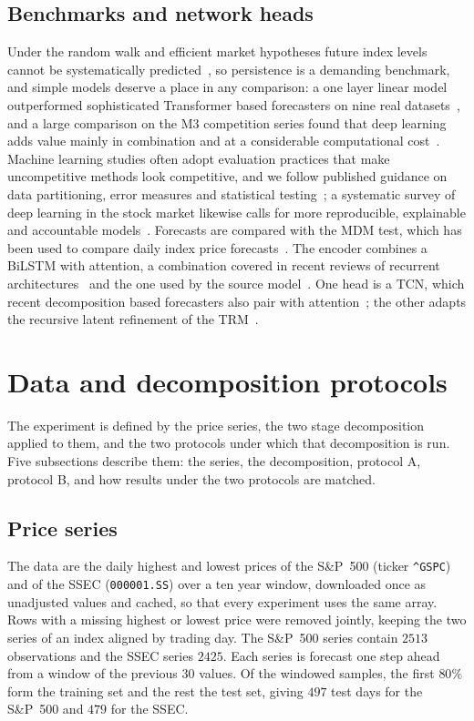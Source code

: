 \subsection{Benchmarks and network heads}
Under the random walk and efficient market hypotheses future index levels
cannot be systematically predicted~\cite{pernagallo2025}, so persistence is a
demanding benchmark, and simple models deserve a place in any comparison: a one
layer linear model outperformed sophisticated Transformer based forecasters on
nine real datasets~\cite{zeng2023}, and a large comparison on the M3 competition
series found that deep learning adds value mainly in combination and at a
considerable computational cost~\cite{makridakis2022}. Machine learning
studies often adopt evaluation practices that make uncompetitive methods look
competitive, and we follow published guidance on data partitioning, error
measures and statistical testing~\cite{hewamalage2022}; a systematic survey of
deep learning in the stock market likewise calls for more reproducible,
explainable and accountable models~\cite{olorunnimbe2022}. Forecasts are
compared with the MDM test, which has been used to compare daily index price
forecasts~\cite{mdmindex2023}. The encoder combines a BiLSTM with attention, a
combination covered in recent reviews of recurrent
architectures~\cite{rnnreview2024} and the one used by the source
model~\cite{gong2024}. One head is a TCN, which recent decomposition based
forecasters also pair with attention~\cite{psovmdtcn2023,emdleak2024}; the
other adapts the recursive latent refinement of the TRM~\cite{jolicoeur2025}.

\section{Data and decomposition protocols}\label{sec:data}

The experiment is defined by the price series, the two stage decomposition
applied to them, and the two protocols under which that decomposition is run.
Five subsections describe them: the series, the decomposition, protocol A,
protocol B, and how results under the two protocols are matched.

\subsection{Price series}
The data are the daily highest and lowest prices of the S\&P~500 (ticker
\texttt{\textasciicircum GSPC}) and of the SSEC (\texttt{000001.SS}) over a
ten year window, downloaded once as unadjusted values and cached, so that
every experiment uses the same array. Rows with a missing highest or lowest
price were removed jointly, keeping the two series of an index aligned by
trading day. The S\&P~500 series contain $2513$ observations and the SSEC
series $2425$. Each series is forecast one step ahead from a window of the
previous $30$ values. Of the windowed samples, the first $80\%$ form the
training set and the rest the test set, giving $497$ test days for the
S\&P~500 and $479$ for the SSEC.

